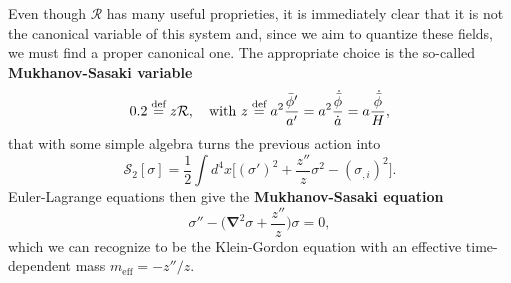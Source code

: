 Even though $\mathcal{R}$ has many useful proprieties, it is immediately clear that it is not the canonical variable of this system and, since we aim to quantize these fields, we must find a proper canonical one. The appropriate choice is the so-called \textbf{Mukhanov-Sasaki variable}
\begin{equation}
    0.2\stackrel{\text{def}}{=} z\mathcal{R},\quad \text{with }z\stackrel{\text{def}}{=} a^2\frac{\bar\phi'}{a'}=a^2\frac{\dot{\bar\phi}}{\dot{a}}=a\frac{\dot{\bar\phi}}{H},\label{eq:SM-variable}
\end{equation}
that with some simple algebra turns the previous action into
\begin{equation}
    \mathcal{S}_{2}[\sigma ]=\frac{1}{2}\int d^4x \Big[(\sigma')^2+\frac{z''}{z}\sigma^2-(\sigma_{,i})^2\Big].   \label{eq:SM-action}
\end{equation}
Euler-Lagrange equations then give the \textbf{Mukhanov-Sasaki equation}
\begin{equation}
    \sigma''-\bigg(\boldsymbol{\nabla}^2\sigma+\frac{z''}{z}\bigg)\sigma=0,\label{eq:SM-equation}
\end{equation}
which we can recognize to be the Klein-Gordon equation with an effective time-dependent mass $m_\text{eff}=-z''/z$.


